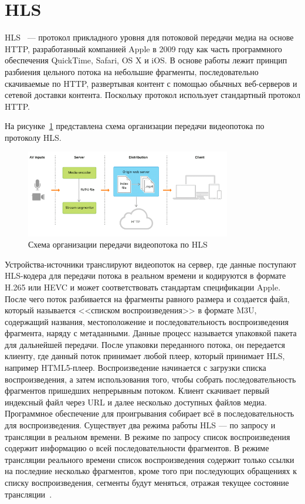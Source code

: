 \section{HLS}

HLS~\cite{hls_apple} --- протокол прикладного уровня для потоковой передачи медиа на основе HTTP, разработанный компанией Apple в 2009 году как часть программного обеспечения QuickTime, Safari, OS X и iOS.
В основе работы лежит принцип разбиения цельного потока на небольшие фрагменты, последовательно скачиваемые по HTTP, развертывая контент с помощью обычных веб-серверов и сетевой доставки контента.
Поскольку протокол использует стандартный протокол HTTP.

На рисунке~\ref{pr:hls} представлена схема организации передачи видеопотока по протоколу HLS.

\begin{figure}[h]
	\centering
	\includegraphics[width=0.8\textwidth]{img/hls.png}
	\caption{Схема организации передачи видеопотока по HLS~\cite{hls_apple}}
	\label{pr:hls}
\end{figure}

Устройства-источники транслируют видеопоток на сервер, где данные поступают HLS-кодера для передачи потока в реальном времени и кодируются в формате H.265 или HEVC и может соответствовать стандартам спецификации Apple.
После чего поток разбивается на фрагменты равного размера и создается файл, который называется <<списком воспроизведения>> в формате M3U, содержащий названия, местоположение и последовательность воспроизведения фрагмента, наряду с метаданными. Данные процесс называется упаковкой пакета для дальнейшей передачи.
После упаковки переданного потока, он передается клиенту, где данный поток принимает любой плеер, который принимает HLS, например HTML5-плеер.
Воспроизведение начинается с загрузки списка воспроизведения, а затем использования того, чтобы собрать последовательность фрагментов пришедших непрерывным потоком. 
Клиент скачивает первый индексный файл через URL и далее несколько доступных файлов медиа. Программное обеспечение для проигрывания собирает всё в последовательность для воспроизведения.
Существует два режима работы HLS --- по запросу и трансляции в реальном времени. 
В режиме по запросу список воспроизведения содержит информацию о всей последовательности фрагментов. В режиме трансляции реального времени список воспроизведения содержит только ссылки на последние несколько фрагментов, кроме того при последующих обращениях к списку воспроизведения, сегменты будут меняться, отражая текущее состояние трансляции~\cite{hls_apple}.

